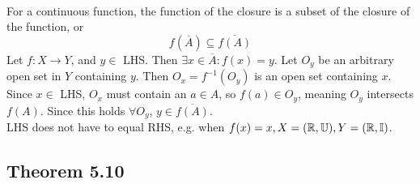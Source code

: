 \begin{parts}
 
\begin{solution}
 \\For a continuous function, the function of the closure is a subset of the closure of the function, or
 $$f(\overline{A}) \subseteq \overline{f(A)}$$
 Let $f: X \rightarrow Y$, and $y \in$ LHS. Then $\exists x \in \overline{A}: f(x) = y$. Let $O_y$ be an arbitrary open set in $Y$ containing $y$. Then $O_x = f^{-1}(O_y)$ is an open set containing $x$. Since $x \in$ LHS, $O_x$ must contain an $a \in A$, so $f(a) \in O_y$, meaning $O_y$ intersects $f(A)$. Since this holds $\forall O_y$, $y \in \overline{f(A)}$. \\
 LHS does not have to equal RHS, e.g. when $f(x) = x, X = (\mathbb{R}, \mathbb{U}), Y = (\mathbb{R}, \mathbb{I})$.
\end{solution}
\end{parts}

\subsection{Theorem 5.10}
\setcounter{question}{0}


